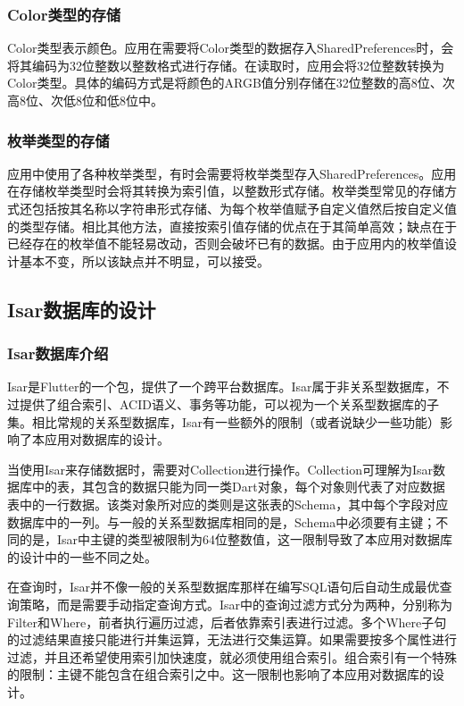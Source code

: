 \subsubsection{Color类型的存储}\label{subsubsec:color-storage}

Color类型表示颜色。应用在需要将Color类型的数据存入SharedPreferences时，会将其编码为32位整数以整数格式进行存储。在读取时，应用会将32位整数转换为Color类型。具体的编码方式是将颜色的ARGB值分别存储在32位整数的高8位、次高8位、次低8位和低8位中。

\subsubsection{枚举类型的存储}\label{subsubsec:enum-storage}

应用中使用了各种枚举类型，有时会需要将枚举类型存入SharedPreferences。应用在存储枚举类型时会将其转换为索引值，以整数形式存储。枚举类型常见的存储方式还包括按其名称以字符串形式存储、为每个枚举值赋予自定义值然后按自定义值的类型存储。相比其他方法，直接按索引值存储的优点在于其简单高效；缺点在于已经存在的枚举值不能轻易改动，否则会破坏已有的数据。由于应用内的枚举值设计基本不变，所以该缺点并不明显，可以接受。

\subsection{Isar数据库的设计}\label{subsec:isar}

\subsubsection{Isar数据库介绍}\label{subsubsec:isar-intro}

Isar是Flutter的一个包，提供了一个跨平台数据库。Isar属于非关系型数据库，不过提供了组合索引、ACID语义、事务等功能，可以视为一个关系型数据库的子集。相比常规的关系型数据库，Isar有一些额外的限制（或者说缺少一些功能）影响了本应用对数据库的设计。

当使用Isar来存储数据时，需要对Collection进行操作。Collection可理解为Isar数据库中的表，其包含的数据只能为同一类Dart对象，每个对象则代表了对应数据表中的一行数据。该类对象所对应的类则是这张表的Schema，其中每个字段对应数据库中的一列。与一般的关系型数据库相同的是，Schema中必须要有主键；不同的是，Isar中主键的类型被限制为64位整数值，这一限制导致了本应用对数据库的设计中的一些不同之处。

在查询时，Isar并不像一般的关系型数据库那样在编写SQL语句后自动生成最优查询策略，而是需要手动指定查询方式。Isar中的查询过滤方式分为两种，分别称为Filter和Where，前者执行遍历过滤，后者依靠索引表进行过滤。多个Where子句的过滤结果直接只能进行并集运算，无法进行交集运算。如果需要按多个属性进行过滤，并且还希望使用索引加快速度，就必须使用组合索引。组合索引有一个特殊的限制：主键不能包含在组合索引之中。这一限制也影响了本应用对数据库的设计。

